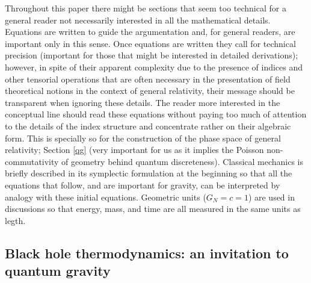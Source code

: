 \documentclass[aps, nofootinbib,superscriptaddress,12pt]{revtex4-2}
\begin{document}
Throughout this paper there might be sections that seem too technical for a general reader not necessarily  interested in all the mathematical details.  Equations are written to guide the argumentation and, for general readers, are important only in this sense. 
Once equations are written they call for technical precision (important for those that might be interested in detailed derivations); however, in spite of their apparent complexity due to the presence of indices and other tensorial operations that are often necessary in the presentation of field theoretical notions in the context of general relativity, their message should be transparent when ignoring these details. The reader more interested in the conceptual line  should read these equations without paying too much of attention to the details of the index structure and concentrate rather on their algebraic form. This is specially so for the construction of the phase space of general relativity; Section \ref{qg} (very important for us as it implies the Poisson non-commutativity of geometry behind quantum discreteness). Classical mechanics is briefly described in its symplectic formulation at the beginning so that all the equations that follow, and are important for gravity, can be interpreted by analogy with these initial equations.  Geometric units ($G_N=c=1$) are used in discussions so that energy, mass, and time are all measured in the same units as legth.
 
\subsection{Black hole thermodynamics: an invitation to quantum gravity} \label{twoty}
\end{document}

